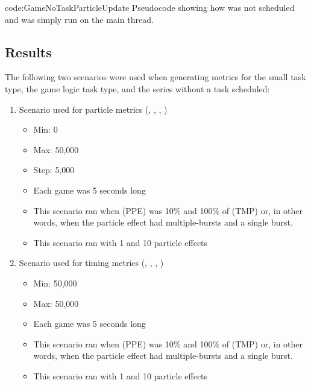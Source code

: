 \vspace{-0.7cm}
{code:GameNoTaskParticleUpdate}
{Pseudocode showing how  was not scheduled and was simply run on the main thread.}
\vspace{-0.74cm}

\subsection{Results}\label{ssec:observe_threads_results}

The following two scenarios were used when generating metrics for the small task type, the game logic task type, and the series without a task scheduled:

\begin{enumerate}[nolistsep,topsep=2pt]

	\item Scenario used for particle metrics (, , , )
	\begin{itemize}[nolistsep,topsep=0pt]
		\item Min: 0
		\item Max: 50,000
		\item Step: 5,000
		\item Each game was 5 seconds long
		\item This scenario ran when  (PPE) was 10\% and 100\% of  (TMP) or, in other words, when the particle effect had multiple-bursts and a single burst.
		\item This scenario ran with 1 and 10 particle effects
	\end{itemize}

	\item Scenario used for timing metrics (, , , )
	\begin{itemize}[nolistsep,topsep=0pt]
		\item Min: 50,000
		\item Max: 50,000
		\item Each game was 5 seconds long
		\item This scenario ran when  (PPE) was 10\% and 100\% of  (TMP) or, in other words, when the particle effect had multiple-bursts and a single burst.
		\item This scenario ran with 1 and 10 particle effects
	\end{itemize}

\end{enumerate}

